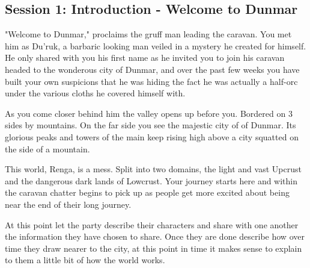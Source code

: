 \documentclass[10pt,twoside,twocolumn]{article}
\begin{document}
\subsection{Session 1: Introduction - Welcome to Dunmar}
\begin{quotebox}
"Welcome to Dunmar," proclaims the gruff man leading the caravan. You met him as Du'ruk, a barbaric looking man veiled in a mystery he created for himself. He only shared with you his first name as he invited you to join his caravan headed to the wonderous city of Dunmar, and over the past few weeks you have built your own suspicions that he was hiding the fact he was actually a half-orc under the various cloths he covered himself with.

As you come closer behind him the valley opens up before you. Bordered on 3 sides by mountains. On the far side you see the majestic city of of Dunmar. Its glorious peaks and towers of the main keep rising high above a city squatted on the side of a mountain.

This world, Renga, is a mess. Split into two domains, the light and vast Upcrust and the dangerous dark lands of Lowcrust. Your journey starts here and within the caravan chatter begins to pick up as people get more excited about being near the end of their long journey.
\end{quotebox}

At this point let the party describe their characters and share with one another the information they have chosen to share. Once they are done describe how over time they draw nearer to the city, at this point in time it makes sense to explain to them a little bit of how the world works.
\end{document}
